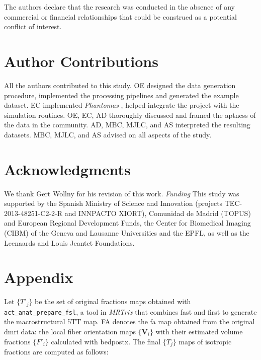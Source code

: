 \documentclass[english]{frontiers/frontiersSCNS} %
\begin{document}
The authors declare that the research was conducted in the absence of any commercial or financial relationships that could be construed as a potential conflict of interest.

\section*{Author Contributions}
All the authors contributed to this study.
OE designed the data generation procedure, implemented the processing pipelines and generated the example dataset.
EC implemented \emph{Phantomas} \citep{caruyer_phantomas_2014}, helped integrate the project with the simulation routines.
OE, EC, AD thoroughly discussed and framed the aptness of the data in the community.
AD, MBC, MJLC, and AS interpreted the resulting datasets.
MBC, MJLC, and AS advised on all aspects of the study.


\section*{Acknowledgments}
We thank Gert Wollny for his revision of this work.
\textit{Funding\textcolon}
This study was supported by the Spanish Ministry of Science and Innovation
  (projects TEC-2013-48251-C2-2-R and INNPACTO XIORT), Comunidad de Madrid (TOPUS) and
  European Regional Development Funds, the Center for Biomedical Imaging
  (CIBM) of the Geneva and Lausanne Universities and the EPFL, as well as the
  Leenaards and Louis Jeantet Foundations.

\nolinenumbers




\glsresetall
\linenumbers
\section*{Appendix}\label{sec:appendix}
Let $\{T'_j\}$ be the set of original fractions maps obtained with \texttt{act\_anat\_prepare\_fsl}, a
  tool in \emph{MRTrix} that combines \gls*{fast} and \gls*{first}
  to generate the macrostructural 5TT map.
FA denotes the \gls*{fa} map obtained from the original \gls*{dmri} data: the local fiber orientation maps
  $\{\mathbf{V}_i\}$ with their estimated volume fractions $\{F'_i\}$ calculated with \gls*{bedpostx}.
The final $\{T_j\}$ maps of isotropic fractions are computed as follows:
\end{document}

